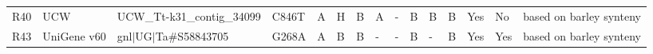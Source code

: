 \begin{sidewaystable}
\begin{localsize}{6}{9}
\begin{tabular}{llllllll!{\extracolsep{4pt}}lllllll}
 R40        & UCW         & UCW\_Tt-k31\_contig\_34099                                         & C846T  & A      & H         & B        & A        & -            & B         & B         & B     & Yes           & No                     & based on barley synteny \\
 R43        & UniGene v60 & gnl$|$UG$|$Ta\#S58843705                                             & G268A  & A      & B         & B        & -        & -            & B         & -         & B     & Yes           & Yes                    & based on barley synteny \\
\bottomrule
\end{tabular}
\end{localsize}
\end{sidewaystable}
